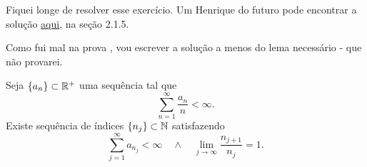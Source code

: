 \begin{problem}
    \label{prob:l5:4}
\end{problem}
\Frowny\;
Fiquei longe de resolver esse exercício. Um Henrique do futuro pode encontrar a solução \href{https://www.research-collection.ethz.ch/server/api/core/bitstreams/8ce179c7-da1f-4862-9404-cefb49d8e64e/content}{aqui},
na seção 2.1.5.

Como fui mal na prova \Frowny, vou escrever a solução a menos do lema necessário - que não provarei.
\begin{lemma}
    Seja $\{a_n\} \subset \mathbb{R}^+$ uma sequência tal que
    $$\sum_{n=1}^{\infty} \frac{a_n}{n} < \infty.$$
    Existe sequência de índices $\{n_j\} \subset \mathbb{N}$ satisfazendo 
    $$\sum_{j=1}^{\infty} a_{n_j} < \infty \quad \land \quad \lim_{j \to \infty} \frac{n_{j+1}}{n_j} = 1.$$ 
\end{lemma}

